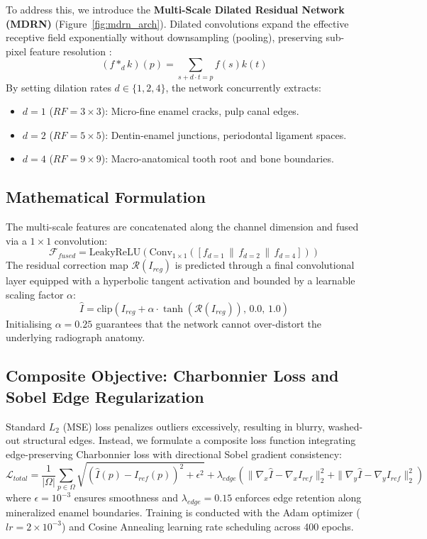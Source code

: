 \documentclass[11pt,a4paper]{article}
\begin{document}
To address this, we introduce the \textbf{Multi-Scale Dilated Residual Network (MDRN)} (Figure~\ref{fig:mdrn_arch}). Dilated convolutions expand the effective receptive field exponentially without downsampling (pooling), preserving sub-pixel feature resolution \cite{yu2015multi}:
\begin{equation}
    (f *_d k)(p) = \sum_{s + d \cdot t = p} f(s) k(t)
\end{equation}
By setting dilation rates $d \in \{1, 2, 4\}$, the network concurrently extracts:
\begin{itemize}
    \item $d=1$ ($RF = 3\times 3$): Micro-fine enamel cracks, pulp canal edges.
    \item $d=2$ ($RF = 5\times 5$): Dentin-enamel junctions, periodontal ligament spaces.
    \item $d=4$ ($RF = 9\times 9$): Macro-anatomical tooth root and bone boundaries.
\end{itemize}

\subsection{Mathematical Formulation}
The multi-scale features are concatenated along the channel dimension and fused via a $1\times 1$ convolution:
\begin{equation}
    \mathcal{F}_{fused} = \text{LeakyReLU}\left( \text{Conv}_{1\times 1} \left( [f_{d=1} \,\|\, f_{d=2} \,\|\, f_{d=4}] \right) \right)
\end{equation}
The residual correction map $\mathcal{R}(I_{reg})$ is predicted through a final convolutional layer equipped with a hyperbolic tangent activation and bounded by a learnable scaling factor $\alpha$:
\begin{equation}
    \hat{I} = \text{clip}\left( I_{reg} + \alpha \cdot \tanh(\mathcal{R}(I_{reg})), \, 0.0, \, 1.0 \right)
\end{equation}
Initialising $\alpha = 0.25$ guarantees that the network cannot over-distort the underlying radiograph anatomy.

\subsection{Composite Objective: Charbonnier Loss and Sobel Edge Regularization}
Standard $L_2$ (MSE) loss penalizes outliers excessively, resulting in blurry, washed-out structural edges. Instead, we formulate a composite loss function integrating edge-preserving Charbonnier loss \cite{charbonnier1997deterministic} with directional Sobel gradient consistency:
\begin{equation}
    \mathcal{L}_{total} = \frac{1}{|\Omega|} \sum_{p \in \Omega} \sqrt{(\hat{I}(p) - I_{ref}(p))^2 + \epsilon^2} + \lambda_{edge} \left( \|\nabla_x \hat{I} - \nabla_x I_{ref}\|_2^2 + \|\nabla_y \hat{I} - \nabla_y I_{ref}\|_2^2 \right)
\end{equation}
where $\epsilon = 10^{-3}$ ensures smoothness and $\lambda_{edge} = 0.15$ enforces edge retention along mineralized enamel boundaries. Training is conducted with the Adam optimizer ($lr = 2 \times 10^{-3}$) and Cosine Annealing learning rate scheduling across 400 epochs.
\end{document}
